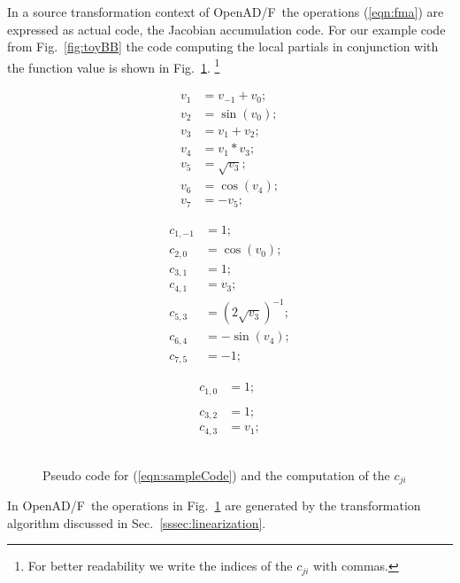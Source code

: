 \documentclass[11pt]{article}
\newcommand{\OpenADF}{OpenAD/F}
\newcommand{\refsec}[1]{{Sec.~\ref{#1}}}
\newcommand{\reffig}[1]{{Fig.~\ref{#1}}}
\newcommand{\refeqn}[1]{{(\ref{#1})}}
\begin{document}
In a source transformation context of \OpenADF\ the operations \refeqn{eqn:fma} are 
expressed as actual code, the Jacobian accumulation code. For our example code 
from \reffig{fig:toyBB} the code computing 
the local partials in conjunction with the function value 
is shown in 
\reffig{fig:toyAndPartials}.
\footnote{
For better readability we write the indices of the $c_{ji}$ with commas.
} 
\begin{figure}
\begin{center}
\begin{minipage}{.3\linewidth}
\begin{align*}
v_1&=v_{-1}+v_0; \\
v_2&=\sin(v_0); \\
v_3&=v_1+v_2; \\
v_4&=v_1*v_3; \\
v_5&=\sqrt{v_3};\\
v_6&=\cos(v_4); \\
v_7&=-v_5;
\end{align*}
\end{minipage}
\begin{minipage}{.3\linewidth}
\begin{align*}
c_{1,-1}&=1; \\
c_{2,0}&=\cos(v_0); \\
c_{3,1}&=1; \\
c_{4,1}&=v_3; \\
c_{5,3}&=(2\sqrt{v_3})^{-1}; \\
c_{6,4}&=-\sin(v_4); \\
c_{7,5}&=-1;
\end{align*}
\end{minipage}
\begin{minipage}{.2\linewidth}
\begin{align*}
c_{1,0}&=1; \\
&\\
c_{3,2}&=1; \\
c_{4,3}&=v_1; \\
&\\
&\\
&
\end{align*}
\end{minipage}
\end{center}	
\caption{Pseudo code for \refeqn{eqn:sampleCode} and the computation of the $c_{ji}$}\label{fig:toyAndPartials}
\end{figure}
In \OpenADF\ the operations in \reffig{fig:toyAndPartials} are generated by the 
transformation algorithm discussed in \refsec{sssec:linearization}.
\end{document}
